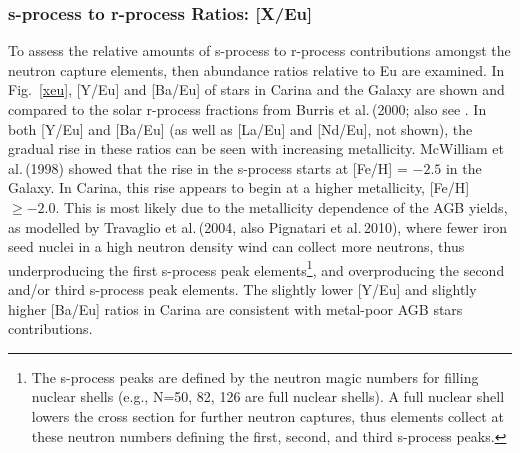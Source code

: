 \documentclass{emulateapj}
\newcommand\etal{{\rm et al.\,}}
\begin{document}


\subsubsection {s-process to r-process Ratios: [X/Eu] \label{s2r}}

To assess the relative amounts of s-process to r-process 
contributions amongst the neutron capture elements, then abundance 
ratios relative to Eu are examined.    In Fig.~\ref{xeu},
[Y/Eu] and [Ba/Eu] of stars in Carina and the Galaxy are shown
and compared to the solar r-process fractions from 
Burris \etal (2000; also see \citealt{Arl99}.
%
In both [Y/Eu] and [Ba/Eu] (as well as [La/Eu] and [Nd/Eu],
not shown), the gradual rise in these ratios can be seen
with increasing metallicity.  McWilliam \etal (1998) showed
that the rise in the s-process starts at [Fe/H] = $-2.5$ in 
the Galaxy.  In Carina, this rise appears to begin at a
higher metallicity, [Fe/H] $\ge -2.0$.   This is most likely
due to the metallicity dependence of the AGB yields, as 
modelled by Travaglio \etal (2004, also Pignatari \etal  2010),
where fewer iron seed nuclei in a high neutron density wind can
collect more neutrons, thus underproducing the first s-process 
peak elements\footnote{The s-process peaks are defined by 
the neutron magic numbers for filling nuclear shells (e.g.,
N=50, 82, 126 are full nuclear shells).  A full nuclear shell
lowers  the cross section for further neutron captures, thus
elements collect at these neutron numbers defining the first,
second, and third s-process peaks.},
and overproducing the second and/or third s-process peak elements.
The slightly lower [Y/Eu] and slightly higher [Ba/Eu] ratios in 
Carina are consistent with metal-poor AGB stars contributions.
\end{document}
